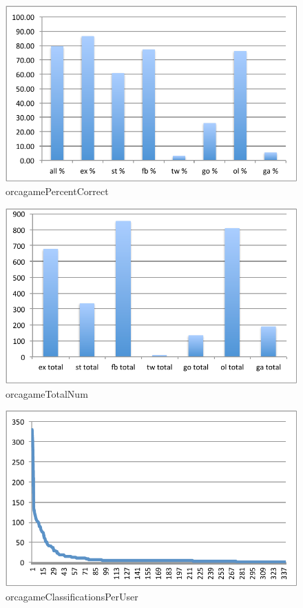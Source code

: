 \documentclass[12pt,oneside]{book}
\begin{document}
\begin{figure}[h]
\centering
\includegraphics[width=\columnwidth]{figures/orcagamePercentCorrect}
\caption{orcagamePercentCorrect}
\label{fig:orcagamePercentCorrect}
\end{figure}

\begin{figure}[h]
\centering
\includegraphics[width=\columnwidth]{figures/orcagameTotalNum}
\caption{orcagameTotalNum}
\label{fig:orcagameTotalNum}
\end{figure}

\begin{figure}[h]
\centering
\includegraphics[width=\columnwidth]{figures/orcagameClassificationsPerUser}
\caption{orcagameClassificationsPerUser}
\label{fig:orcagameClassificationsPerUser}
\end{figure}
\end{document}
